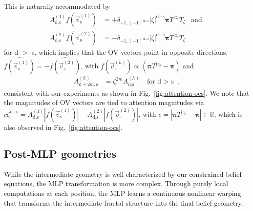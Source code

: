 \documentclass{article}
\theoremstyle{plain}
\theoremstyle{definition}
\theoremstyle{remark}
\newcommand{\stationary}{\boldsymbol{\pi}}
\begin{document}
This is naturally accommodated by
\begin{align}
A_{\text{d}, \text{s}}^{(1)} f(\vec{v}_\text{s}^{(1)}) &= 
+\delta_{+1,(-1)^{\text{d}-\text{s}}}
|\zeta|^{\text{d}-\text{s}} \stationary
     T^{|z_{\text{s}}} 
     T_\zeta
     &\text{and } \\
A_{\text{d}, \text{s}}^{(2)} f(\vec{v}_\text{s}^{(2)}) &= 
-\delta_{-1,(-1)^{\text{d}-\text{s}}}
|\zeta|^{\text{d}-\text{s}} \stationary
     T^{|z_{\text{s}}} 
     T_\zeta
\label{eq:Ads_2head_relation}
\end{align}
for d $>$ s,
which implies that the OV-vectors point in opposite directions,
$\widehat{f(\vec{v}_\text{s}^{(1)})} = - \widehat{f(\vec{v}_\text{s}^{(2)})}$,
with 
$f(\vec{v}_\text{s}^{(h)}) \propto (\stationary
     T^{|z_{\text{s}}} - \stationary)$
and
\begin{align}
A_{\text{d}+2m, \text{s}}^{(h)} &= \zeta^{2m} A_{\text{d} , \text{s}}^{(h)}  &\text{for d $>$ s} ~,
\label{eq:DoubleAttention_dest_relation}
\end{align}
consistent with our experiments 
as shown in Fig.~\ref{fig:attention-ocs}.
We note that the
magnitudes of OV vectors are tied to attention magnitudes via
$c \zeta^{\text{d} - \text{s}} = 
A_{\text{d}, \text{s}}^{(1)} | f(\vec{v}_\text{s}^{(1)}) | - A_{\text{d}, \text{s}}^{(2)} | f(\vec{v}_\text{s}^{(2)}) |$,
with $c = | \stationary T^{|z_{\text{s}}} - \stationary| \in \mathbb{R}$,
which is also observed in Fig.~\ref{fig:attention-ocs}.





\subsection{Post-MLP geometries}

While the intermediate geometry is well characterized by our constrained belief equations, the MLP transformation is more complex. Through purely local computations at each position, the MLP learns a continuous nonlinear warping that transforms the intermediate fractal structure into the final belief geometry. 
\end{document}
